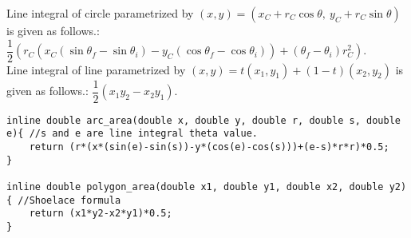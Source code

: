 \documentclass[landscape, 10pt, a4paper, oneside,  twocolumn]{article}
\begin{document}
Line integral of circle parametrized by $(x, y) = (x_C + r_C \cos \theta, \ y_C + r_C \sin \theta)$ is given as follows.:  $\dfrac{1}{2}( r_C (x_C (\sin \theta_f - \sin \theta_i) - y_C (\cos \theta_f - \cos \theta_i) ) + (\theta_f - \theta_i) r_C ^ 2)$. \\

Line integral of line parametrized by $(x, y) = t(x_1, y_1) + (1-t)(x_2, y_2)$ is given as follows.: $\dfrac{1}{2} (x_1 y_2 - x_2 y_1)$.

\begin{verbatim}
inline double arc_area(double x, double y, double r, double s, double e){ //s and e are line integral theta value.
	return (r*(x*(sin(e)-sin(s))-y*(cos(e)-cos(s)))+(e-s)*r*r)*0.5;
}

inline double polygon_area(double x1, double y1, double x2, double y2){ //Shoelace formula 
	return (x1*y2-x2*y1)*0.5;
}
\end{verbatim}
\end{document}
